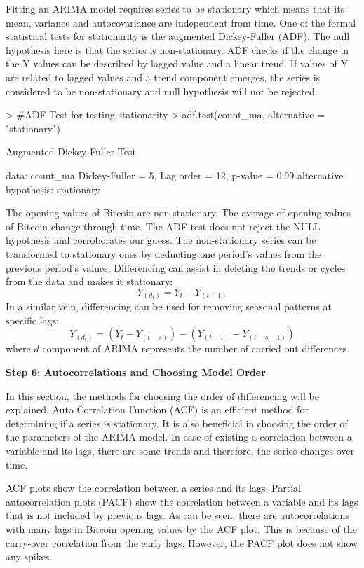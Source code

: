 \documentclass{article}
\begin{document}
Fitting an ARIMA model requires series to be stationary which means that its mean, variance and autocovariance are independent from time. One of the formal statistical tests for stationarity is the augmented Dickey-Fuller (ADF). The null hypothesis here is that the series is non-stationary. ADF checks if the change in the Y values can be described by lagged value and a linear trend. If values of Y are related to lagged values and a trend component emerges, the series is considered to be non-stationary and null hypothesis will not be rejected.
\begin{Schunk}
\begin{Sinput}
> #ADF Test for testing stationarity
> adf.test(count_ma, alternative = "stationary")
\end{Sinput}
\begin{Soutput}
	Augmented Dickey-Fuller Test

data:  count_ma
Dickey-Fuller = 5, Lag order = 12, p-value = 0.99
alternative hypothesis: stationary
\end{Soutput}
\end{Schunk}
The opening values of Bitcoin are non-stationary. The average of opening values of Bitcoin change through time. The ADF test does not reject the NULL hypothesis and corroborates our guess.
The non-stationary series can be transformed to stationary ones by deducting one period's values from the previous period's values. Differencing can assist in deleting the trends or cycles from the data and makes it stationary:
\begin{equation}
Y_(d_t )=Y_t-Y_(t-1)
\end{equation}
In a similar vein, differencing can be used for removing seasonal patterns at specific lags:
\begin{equation}
Y_(d_t )=(Y_t-Y_(t-s) )-(Y_(t-1)-Y_(t-s-1))
\end{equation}
where $d$ component of ARIMA represents the number of carried out differences.

\textbf{Step 6: Autocorrelations and Choosing Model Order}

In this section, the methods for choosing the order of differencing will be explained. Auto Correlation Function (ACF) is an efficient method for determining if a series is stationary. It is also beneficial in choosing the order of the parameters of the ARIMA model.  In case of existing a correlation between a variable and its lags, there are some trends and therefore, the series changes over time. 

ACF plots show the correlation between a series and its lags. Partial autocorrelation plots (PACF) show the correlation between a variable and its lags that is not included by previous lags. 
As can be seen, there are autocorrelations with many lags in Bitcoin opening values by the ACF plot. This is because of the carry-over correlation from the early lags. However, the PACF plot does not show any spikes.
\end{document}
